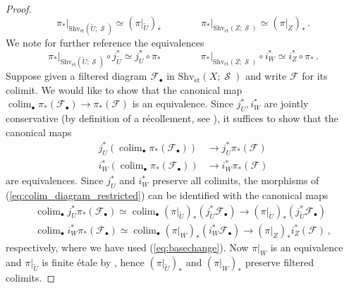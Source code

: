 \documentclass{article}
\DeclareMathOperator{\Spaces}{\mathcal{S}} %
\DeclareMathOperator*{\colim}{\ensuremath{\operatorname{colim}}}
\theoremstyle{definition}
\newcommand{\Lucy}[1]{\todo[color=cyan!30]{\footnotesize L: #1}}
\begin{document}
\begin{proof}
\begin{equation}
         \left. \pi_* \right|_{\mathrm{Shv}_{\mathrm{\acute{e}t}}(\widetilde{U}; \Spaces)} \simeq (\pi|_{\widetilde{U}})_* \qquad \qquad  \left. \pi_* \right|_{\mathrm{Shv}_{\mathrm{\acute{e}t}}(Z; \Spaces)} \simeq (\pi|_{Z})_* \,. 
    \end{equation}
    We note for further reference the equivalences\Lucy{diagram instead?}
    \begin{equation}\label{eq:basechange}
         \left. \pi_* \right|_{\mathrm{Shv}_{\mathrm{\acute{e}t}}(\widetilde{U}; \Spaces)} \circ j_{\widetilde{U}}^* \simeq j_U^* \circ \pi_* \qquad \qquad \left. \pi_* \right|_{\mathrm{Shv}_{\mathrm{\acute{e}t}}(Z; \Spaces)}  \circ i_W^* \simeq i_Z^* \circ \pi_* \,.
    \end{equation}
    Suppose given a filtered diagram $ \mathcal{F}_\bullet $ in $ \mathrm{Shv}_{\mathrm{\acute{e}t}}(X; \Spaces) $ and write $ \mathcal{F} $ for its colimit. 
    We would like to show that the canonical map $ \colim_\bullet \pi_*(\mathcal{F}_\bullet) \to \pi_*(\mathcal{F}) $ is an equivalence.  
    Since $ j_U^*, i_W^* $ are jointly conservative (by definition of a r\'ecollement, see \cite[Definition A.8.1(e)]{LurHA}), it suffices to show that the canonical maps
    \begin{equation}\label{eq:colim_diagram_restricted}
    \begin{split}
        j^*_U \left(\colim_\bullet \pi_*(\mathcal{F}_\bullet) \right) & \to j^*_U \pi_*(\mathcal{F}) \\
        i^*_W \left(\colim_\bullet \pi_*(\mathcal{F}_\bullet) \right) & \to i_W^* \pi_*(\mathcal{F})      
    \end{split}
    \end{equation}
    are equivalences. 
    Since $ j^*_U $ and $ i^*_W $ preserve all colimits, the morphisms of (\ref{eq:colim_diagram_restricted}) can be identified with the canonical maps
    \begin{equation*}
    \begin{split}
        \colim_\bullet j^*_U \pi_*(\mathcal{F}_\bullet) \simeq \colim_\bullet (\pi|_{\widetilde{U}})_*(j^*_{\widetilde{U}}\mathcal{F}_\bullet) \to (\pi|_{\widetilde{U}})_*(j^*_{\widetilde{U}}\mathcal{F}_\bullet) \\
        \colim_\bullet i^*_W \pi_*(\mathcal{F}_\bullet) \simeq \colim_\bullet (\pi|_{W})_*(i^*_{W}\mathcal{F}_\bullet) \to (\pi|_{Z})_* i_Z^*(\mathcal{F})     \,,    
    \end{split}
    \end{equation*}
    respectively, where we have used (\ref{eq:basechange}). 
    Now $ \pi|_W $ is an equivalence and $ \pi|_{\widetilde{U}} $ is finite \'etale by \cite[Proposition 4.47]{azumaya_involution}, hence $ (\pi|_{\widetilde{U}})_* $ and $ (\pi|_{W})_* $ preserve filtered colimits. 
\end{proof}
\end{document}
